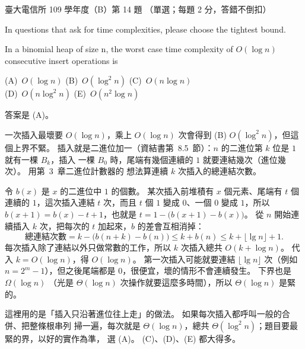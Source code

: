 \begin{pastexam}[label={px:ntu-109-comm-dsa-14}]{臺大電信所 109 學年度（B）第 14 題}
（單選；每題 2 分，答錯不倒扣）

In questions that ask for time complexities, please choose the tightest bound.

In a binomial heap of size n, the worst case time complexity of $O(\log n)$ consecutive insert operations is

(A)~$O(\log n)$ \qquad (B)~$O(\log^2 n)$ \qquad (C)~$O(n\log n)$\\
(D)~$O(n\log^2 n)$ \qquad (E)~$O(n^2\log n)$
\end{pastexam}

\begin{pastsoln}
答案是 (A)。

一次插入最壞要 $O(\log n)$，乘上 $O(\log n)$ 次會得到 (B) $O(\log^2 n)$，但這個上界不緊。
插入就是二進位加一（資結書第~8.5~節）：$n$ 的二進位第 $k$ 位是 $1$ 就有一棵 $B_k$，插入
一棵 $B_0$ 時，尾端有幾個連續的 $1$ 就要連結幾次（進位幾次）。 用第~3~章二進位計數器的
想法算連續 $k$ 次插入的總連結次數。

令 $b(x)$ 是 $x$ 的二進位中 $1$ 的個數。 某次插入前堆積有 $x$ 個元素、尾端有 $t$ 個連續的
$1$，這次插入連結 $t$ 次，而且 $t$ 個 $1$ 變成 $0$、一個 $0$ 變成 $1$，所以
$b(x + 1) = b(x) - t + 1$，也就是 $t = 1 - \bigl(b(x + 1) - b(x)\bigr)$。 從 $n$ 開始連續插入
$k$ 次，把每次的 $t$ 加起來，$b$ 的差會互相消掉：
\[
\text{總連結次數} = k - \bigl(b(n + k) - b(n)\bigr) \le k + b(n) \le k + \lfloor \lg n \rfloor + 1.
\]
每次插入除了連結以外只做常數的工作，所以 $k$ 次插入總共 $O(k + \log n)$。 代入
$k = O(\log n)$，得 $O(\log n)$。 第一次插入可能就要連結 $\lfloor \lg n \rfloor$ 次（例如
$n = 2^m - 1$），但之後尾端都是 $0$，很便宜，壞的情形不會連續發生。 下界也是 $\Omega(\log n)$
（光是 $\Theta(\log n)$ 次操作就要這麼多時間），所以 $\Theta(\log n)$ 是緊的。

這裡用的是「插入只沿著進位往上走」的做法。 如果每次插入都呼叫一般的合併、把整條根串列
掃一遍，每次就是 $\Theta(\log n)$，總共 $\Theta(\log^2 n)$；題目要最緊的界，以好的實作為準，
選 (A)。 (C)、(D)、(E) 都大得多。
\end{pastsoln}

